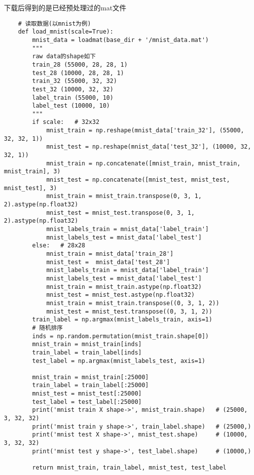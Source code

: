 \documentclass[UTF8]{ctexart}
\begin{document}
                下载后得到的是已经预处理过的mat文件
                \begin{verbatim}
    # 读取数据(以mnist为例)
    def load_mnist(scale=True):
        mnist_data = loadmat(base_dir + '/mnist_data.mat')
        """
        raw data的shape如下
        train_28 (55000, 28, 28, 1)
        test_28 (10000, 28, 28, 1)
        train_32 (55000, 32, 32)
        test_32 (10000, 32, 32)
        label_train (55000, 10)
        label_test (10000, 10)
        """
        if scale:   # 32x32
            mnist_train = np.reshape(mnist_data['train_32'], (55000, 32, 32, 1))
            mnist_test = np.reshape(mnist_data['test_32'], (10000, 32, 32, 1))
            mnist_train = np.concatenate([mnist_train, mnist_train, mnist_train], 3)
            mnist_test = np.concatenate([mnist_test, mnist_test, mnist_test], 3)
            mnist_train = mnist_train.transpose(0, 3, 1, 2).astype(np.float32)
            mnist_test = mnist_test.transpose(0, 3, 1, 2).astype(np.float32)
            mnist_labels_train = mnist_data['label_train']
            mnist_labels_test = mnist_data['label_test']
        else:   # 28x28
            mnist_train = mnist_data['train_28']
            mnist_test =  mnist_data['test_28']
            mnist_labels_train = mnist_data['label_train']
            mnist_labels_test = mnist_data['label_test']
            mnist_train = mnist_train.astype(np.float32)
            mnist_test = mnist_test.astype(np.float32)
            mnist_train = mnist_train.transpose((0, 3, 1, 2))
            mnist_test = mnist_test.transpose((0, 3, 1, 2))
        train_label = np.argmax(mnist_labels_train, axis=1)
        # 随机排序
        inds = np.random.permutation(mnist_train.shape[0])
        mnist_train = mnist_train[inds]
        train_label = train_label[inds]
        test_label = np.argmax(mnist_labels_test, axis=1)
    
        mnist_train = mnist_train[:25000]
        train_label = train_label[:25000]
        mnist_test = mnist_test[:25000]
        test_label = test_label[:25000]
        print('mnist train X shape->', mnist_train.shape)   # (25000, 3, 32, 32)
        print('mnist train y shape->', train_label.shape)   # (25000,)
        print('mnist test X shape->', mnist_test.shape)     # (10000, 3, 32, 32)
        print('mnist test y shape->', test_label.shape)     # (10000,)

        return mnist_train, train_label, mnist_test, test_label
                \end{verbatim}
\end{document}
